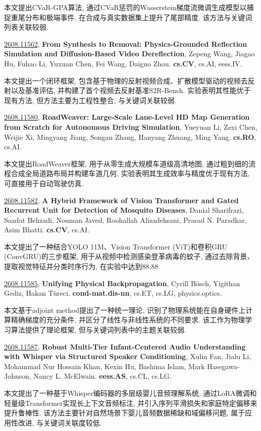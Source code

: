 \documentclass[9pt, a4paper]{article}
\theoremstyle{plain}
\theoremstyle{definition}
\theoremstyle{remark}
\newcommand{\arxivwithtarget}[3]{\hypertarget{#1}{}\href{https://arxiv.org/abs/#1}{#1}, \textbf{\textcolor{arxivblue}{#2}}, #3. }
\begin{document}
本文提出CVaR-GPA算法, 通过CVaR惩罚的Wasserstein梯度流微调生成模型以捕捉重尾分布和极端事件, 在合成与真实数据集上提升了尾部精度. 该方法与关键词列表关联较弱.


\arxivwithtarget{2608.11562}{From Synthesis to Removal: Physics-Grounded Reflection Simulation and Diffusion-Based Video Dereflection}{Zepeng Wang, Jiagao Hu, Fuhao Li, Yuxuan Chen, Fei Wang, Daiguo Zhou}\textbf{cs.CV}, cs.AI, eess.IV.

本文提出一个闭环框架, 包含基于物理的反射视频合成、扩散模型驱动的视频去反射以及基准评估, 并构建了首个视频去反射基准S2R-Bench. 实验表明其性能优于现有方法, 但方法主要为工程性整合, 与关键词关联较弱.


\arxivwithtarget{2608.11580}{RoadWeaver: Large-Scale Lane-Level HD Map Generation from Scratch for Autonomous Driving Simulation}{Yueyuan Li, Zexi Chen, Weijie Xi, Mingyang Jiang, Songan Zhang, Hanyang Zhuang, Ming Yang}\textbf{cs.RO}, cs.AI.

本文提出RoadWeaver框架, 用于从零生成大规模车道级高清地图, 通过粗到细的流程合成全局道路布局并构建车道几何, 实验表明其生成效率与精度优于现有方法, 可直接用于自动驾驶仿真.


\arxivwithtarget{2608.11582}{A Hybrid Framework of Vision Transformer and Gated Recurrent Unit for Detection of Mosquito Diseases}{Danial Sharifrazi, Saadat Behzadi, Nouman Javed, Roohallah Alizadehsani, Prasad N. Paradkar, Asim Bhatti}\textbf{cs.CV}, cs.AI.

本文提出了一种结合YOLO 11M、Vision Transformer (ViT)和卷积GRU (ConvGRU)的三步框架, 用于从视频中检测感染登革病毒的蚊子, 通过去除背景、提取视觉特征并分类时序行为, 在实验中达到88.88%


\arxivwithtarget{2608.11585}{Unifying Physical Backpropagation}{Cyrill Bösch, Yigithan Gediz, Hakan Türeci}\textbf{cond-mat.dis-nn}, cs.ET, cs.LG, physics.optics.

本文基于adjoint method提出了一种统一理论, 识别了物理系统能在自身硬件上计算精确梯度的充分条件, 并区分了线性与非线性系统的不同要求. 该工作为物理学习算法提供了理论框架, 但与关键词列表中的主题关联较弱.


\arxivwithtarget{2608.11587}{Robust Multi-Tier Infant-Centered Audio Understanding with Whisper via Structured Speaker Conditioning}{Xulin Fan, Jialu Li, Mohammad Nur Hossain Khan, Kexin Hu, Bashima Islam, Mark Hasegawa-Johnson, Nancy L. McElwain}\textbf{eess.AS}, cs.CL, cs.LG.

本文提出了一种基于Whisper编码器的多层级婴儿音频理解系统, 通过LoRA微调和轻量级Transformer实现长上下文音频标注, 并引入序列平滑损失和家庭特定偏移来提升鲁棒性. 该方法主要针对自然场景下婴儿音频数据稀缺和域偏移问题, 属于应用性改进, 与关键词关联度较低.
\end{document}
